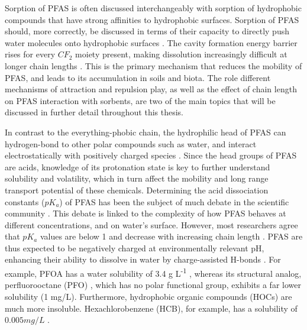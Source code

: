 Sorption of PFAS is often discussed interchangeably with sorption of hydrophobic compounds that have strong affinities to hydrophobic surfaces. Sorption of PFAS should, more correctly, be discussed in terms of their capacity to directly push water molecules onto hydrophobic surfaces \citep{Arp2006}. The cavity formation energy barrier rises for every $CF_2$ moiety present, making dissolution increasingly difficult at longer chain lengths \citep{bhhatarai2011,Arp2006}. This is the primary mechanism that reduces the mobility of PFAS, and leads to its accumulation in soils and biota. The role different mechanisms of attraction and repulsion play, as well as the effect of chain length on PFAS interaction with sorbents, are two of the main topics that will be discussed in further detail throughout this thesis. 

In contrast to the everything-phobic chain, the hydrophilic head of PFAS can hydrogen-bond to other polar compounds such as water, and interact electrostatically with positively charged species \citep{sigmund2022sorption}. Since the head groups of PFAS are acids, knowledge of its protonation state is key to further understand solubility and volatility, which in turn affect the mobility and long range transport potential of these chemicals. Determining the acid dissociation constants (\(pK_a\)) of PFAS has been the subject of much debate in the scientific community \citep{Goss2009comment}. This debate is linked to the complexity of how PFAS behaves at different concentrations, and on water's surface. However, most researchers agree that \(pK_a\) values are below 1 and decrease with increasing chain length \citep{wang2011physchem,Reemtsma2016}. PFAS are thus expected to be negatively charged at environmentally relevant pH, enhancing their ability to dissolve in water by charge-assisted H-bonds \citep{Reemtsma2016}. For example, PFOA has a water solubility of 3.4 g L\textsuperscript{-1} \citep{PFOA}, whereas its structural analog, perfluorooctane (PFO) \citep{PFO}, which has no polar functional group, exhibits a far lower solubility (1 mg/L). Furthermore, hydrophobic organic compounds (\acrshort{HOC}s) are much more insoluble. Hexachlorobenzene (HCB), for example, has a solubility of $0.005 mg/L$ \citep{mcphedran2013hydrophobic}. 


